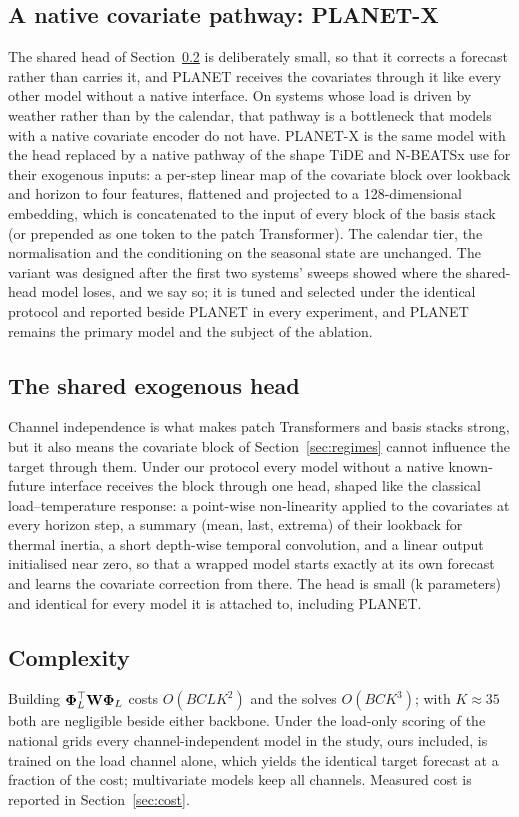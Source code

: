 \subsection{A native covariate pathway: PLANET-X}
\label{sec:planetx}
The shared head of Section~\ref{sec:head} is deliberately small, so that it corrects a
forecast rather than carries it, and PLANET receives the covariates through it like every
other model without a native interface. On systems whose load is driven by weather rather
than by the calendar, that pathway is a bottleneck that models with a native covariate
encoder do not have. PLANET-X is the same model with the head replaced by a native pathway of
the shape TiDE and N-BEATSx use for their exogenous inputs: a per-step linear map of the
covariate block over lookback and horizon to four features, flattened and projected to a
128-dimensional embedding, which is concatenated to the input of every block of the basis
stack (or prepended as one token to the patch Transformer). The calendar tier, the
normalisation and the conditioning on the seasonal state are unchanged. The variant was
designed after the first two systems' sweeps showed where the shared-head model loses, and we
say so; it is tuned and selected under the identical protocol and reported beside PLANET in
every experiment, and PLANET remains the primary model and the subject of the ablation.

\subsection{The shared exogenous head}
\label{sec:head}
Channel independence is what makes patch Transformers and basis stacks strong, but it also
means the covariate block of Section~\ref{sec:regimes} cannot influence the target through
them. Under our protocol every model without a native known-future interface receives the
block through one head, shaped like the classical load--temperature response: a point-wise
non-linearity applied to the covariates at every horizon step, a summary (mean, last, extrema)
of their lookback for thermal inertia, a short depth-wise temporal convolution, and a linear
output initialised near zero, so that a wrapped model starts exactly at its own forecast and
learns the covariate correction from there. The head is small
(k parameters) and identical for every model it is attached to,
including PLANET.

\subsection{Complexity}
Building $\boldsymbol{\Phi}_L^\top\mathbf{W}\boldsymbol{\Phi}_L$ costs $O(BCLK^2)$ and the solves $O(BCK^3)$; with
$K\approx 35$ both are negligible beside either backbone. Under the load-only scoring of the
national grids every channel-independent model in the study, ours included, is trained on the
load channel alone, which yields the identical target forecast at a fraction of the cost;
multivariate models keep all channels. Measured cost is reported in
Section~\ref{sec:cost}.
